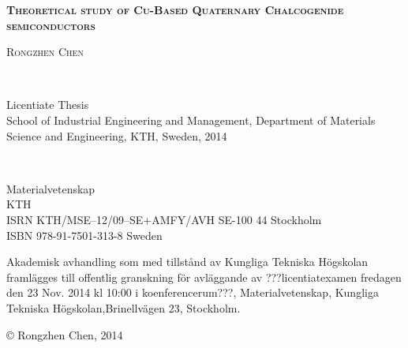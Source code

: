 \documentclass[a4paper, 12pt, titlepage,oneside,drop]{kthesis}
\begin{document}
\setcounter{page}{1}

\begin{center}




  \vspace{5 cm}





  \vspace{12pt}
  \textsc{\LARGE{\textbf{{Theoretical study of Cu-Based Quaternary Chalcogenide semiconductors}}}}
  \vspace{12pt}

  \vspace{5 cm}

  \textsc{\large{Rongzhen Chen}}


  \vfill 

  \ 

  \large{Licentiate Thesis}
  \\
  \large{School of Industrial Engineering and Management,
  Department of Materials Science and Engineering,
  KTH, Sweden, 2014}

\end{center}

 \thispagestyle{empty}



\newpage
\setcounter{page}{2}
\thispagestyle{empty}
\
\vfill

\begin{flushright}
 Materialvetenskap\\
 KTH\\
ISRN KTH/MSE--12/09--SE+AMFY/AVH
 \hfill SE-100 44 Stockholm\\ ISBN 978-91-7501-313-8  \hfill
Sweden\\
\end{flushright}


\vspace{5mm}

Akademisk avhandling som med tillstånd av Kungliga Tekniska
Högskolan framlägges till offentlig granskning för avläggande av
{\color{red}???licentiatexamen fredagen den 23 Nov. 2014 kl 10:00 i koenferencerum???}, Materialvetenskap, Kungliga Tekniska
Högskolan,\linebreak Brinellvägen 23, Stockholm.

\vspace{5mm}

\copyright \hspace{3pt} {\color{red}Rongzhen Chen, 2014}
\end{document}
